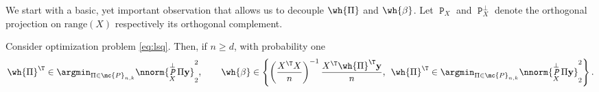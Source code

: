 \documentclass[11pt]{article}
\DeclareMathOperator{\pr}{\texttt{P}}
\DeclareMathOperator{\pre}{\emph{\texttt{P}}}
\def\y{\mathbf{y}}
\begin{document}
We start with a basic, yet important observation that allows us to decouple $\wh{\Pi}$ and $\wh{\beta}$. Let
$\pr_X$ and $\pr_X^{\perp}$ denote the orthogonal projection on $\text{range}(X)$ respectively its orthogonal complement.%

\begin{lemma}\label{lem:decoupling} Consider optimization problem \eqref{eq:lsq}. Then, if $n \geq  d$, with probability one 
\begin{equation}\label{eq:decomposition}  
  \wh{\Pi}^{\T} \in \argmin_{\Pi \in \mc{P}_{n,k}} \nnorm{\pre_X^{\perp} \Pi \mathbf{y}}_2^2, \qquad \wh{\beta} \in \left\{ \left(\frac{X^{\T} X}{n} \right)^{-1} \frac{X^{\T} \wh{\Pi}^{\T} \y}{n},
  \; \, \wh{\Pi}^{\T} \in \argmin_{\Pi \in \mc{P}_{n,k}} \nnorm{\pre_X^{\perp} \Pi \mathbf{y}}_2^2 \right \}.  
\end{equation}
\end{lemma}
\end{document}
